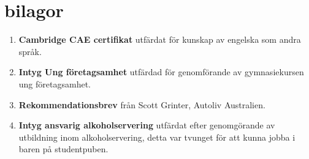 \documentclass[]{friggeri-cv} %
\begin{document}
\section{bilagor}
\begin{enumerate}
	\item \textbf{Cambridge CAE certifikat} utfärdat för kunskap av engelska som andra språk.
	\item \textbf{Intyg Ung företagsamhet} utfärdad för genomförande av gymnasiekursen ung företagsamhet.
	\item \textbf{Rekommendationsbrev} från Scott Grinter, Autoliv Australien.
	\item \textbf{Intyg ansvarig alkoholservering} utfärdat efter genomgörande av utbildning inom alkoholservering, detta var tvunget för att kunna jobba i baren på studentpuben.
\end{enumerate}
\newpage
\appendix





\end{document}
